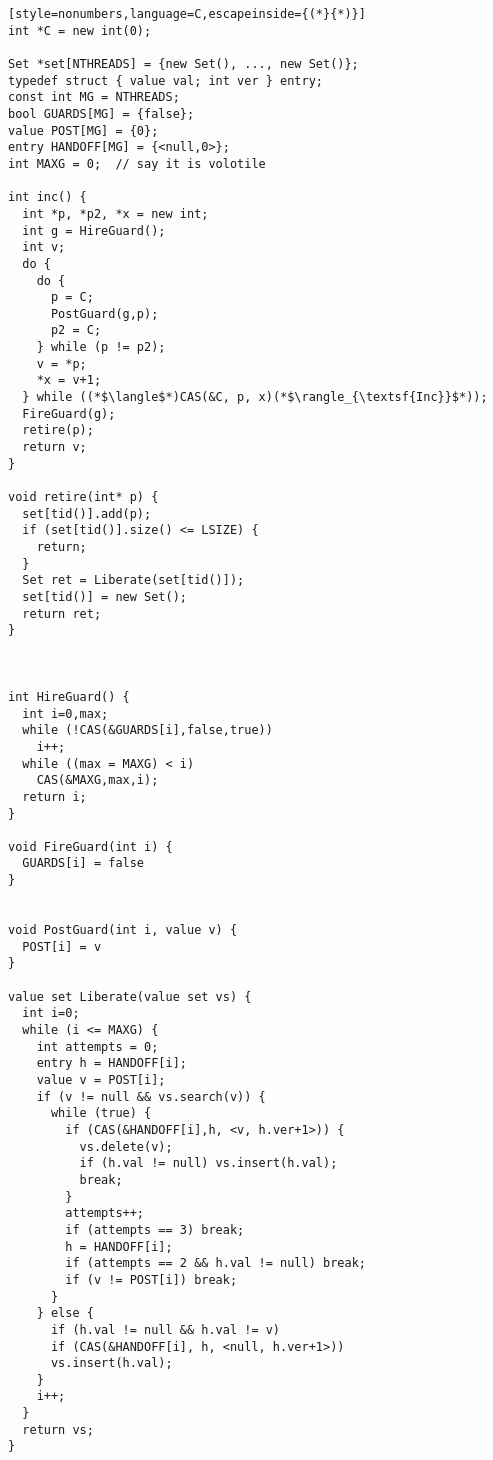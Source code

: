 {\small
\begin{lstlisting}[style=nonumbers,language=C,escapeinside={(*}{*)}]
int *C = new int(0);

Set *set[NTHREADS] = {new Set(), ..., new Set()};
typedef struct { value val; int ver } entry;
const int MG = NTHREADS;
bool GUARDS[MG] = {false}; 
value POST[MG] = {0};  
entry HANDOFF[MG] = {<null,0>}; 
int MAXG = 0;  // say it is volotile

int inc() {
  int *p, *p2, *x = new int;
  int g = HireGuard();
  int v;
  do {
    do {
      p = C;
      PostGuard(g,p);
      p2 = C;
    } while (p != p2);
    v = *p;
    *x = v+1;
  } while ((*$\langle$*)CAS(&C, p, x)(*$\rangle_{\textsf{Inc}}$*));
  FireGuard(g);
  retire(p);
  return v;
}

void retire(int* p) {  
  set[tid()].add(p);
  if (set[tid()].size() <= LSIZE) {
    return;
  }
  Set ret = Liberate(set[tid()]);
  set[tid()] = new Set();
  return ret;
}



int HireGuard() {
  int i=0,max;
  while (!CAS(&GUARDS[i],false,true))
    i++;
  while ((max = MAXG) < i)
    CAS(&MAXG,max,i); 
  return i;
}

void FireGuard(int i) {
  GUARDS[i] = false
}


void PostGuard(int i, value v) {
  POST[i] = v
}

value set Liberate(value set vs) {  
  int i=0;
  while (i <= MAXG) {
    int attempts = 0;
    entry h = HANDOFF[i];
    value v = POST[i];
    if (v != null && vs.search(v)) { 
      while (true) {
        if (CAS(&HANDOFF[i],h, <v, h.ver+1>)) { 
          vs.delete(v);
          if (h.val != null) vs.insert(h.val);
          break;
        }
        attempts++;
        if (attempts == 3) break;  
        h = HANDOFF[i];
        if (attempts == 2 && h.val != null) break;
        if (v != POST[i]) break;
      }
    } else {
      if (h.val != null && h.val != v) 
      if (CAS(&HANDOFF[i], h, <null, h.ver+1>)) 
      vs.insert(h.val);
    }
    i++;
  }
  return vs;
}

\end{lstlisting}
}



